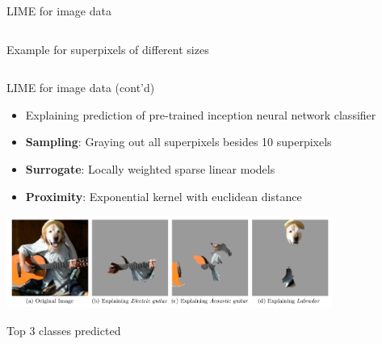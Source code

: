 \documentclass[11pt,compress,t,notes=noshow, aspectratio=169, xcolor=table]{beamer}
\begin{document}
\begin{frame}{LIME for image data}
\begin{columns}[totalwidth=\textwidth]
\begin{column}{0.26\textwidth}
\begin{center}
				{Example for superpixels of different sizes}
			\end{center}
		\end{column}
	\end{columns}
    
\end{frame}
\begin{frame}{LIME for image data (cont'd) }
	\begin{itemize}
		\item Explaining prediction of pre-trained inception neural network classifier
		\item \textbf{Sampling}: Graying out all superpixels besides 10 superpixels
		\item \textbf{Surrogate}: Locally weighted sparse linear models 
		\item \textbf{Proximity}: Exponential kernel with euclidean distance
	\end{itemize}
	\vspace{-0.3cm}
	\begin{center}
		\includegraphics[width=0.8\textwidth]{figure/lime-images}
		
		{Top 3 classes predicted}
	\end{center}
	
\end{frame}
\endlecture
\end{document}
